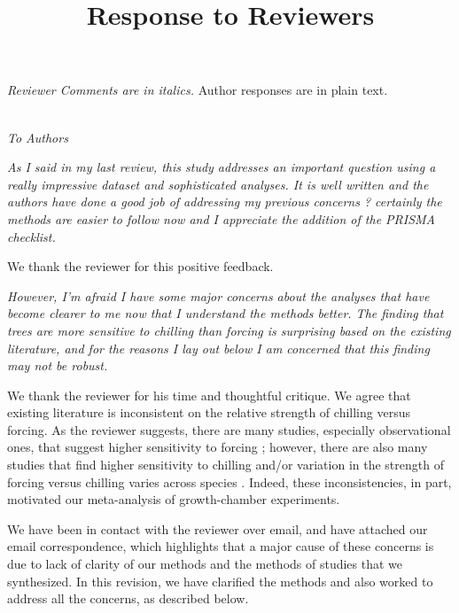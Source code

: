 \documentclass[11pt, a4paper]{article}
\begin{document}
{}


\setlength\parindent{0pt}


\title{Response to Reviewers}
\emph{Reviewer Comments are in italics.} Author responses are in plain text.\\

 \emph{}\\

\par \emph{To Authors}
\par \emph{As I said in my last review, this study addresses an important question using a really impressive
dataset and sophisticated analyses. It is well written and the authors have done a good job of
addressing my previous concerns ? certainly the methods are easier to follow now and I appreciate
the addition of the PRISMA checklist.}\\
\par We thank the reviewer for this positive feedback.
\par \emph{However, I'm afraid I have some major concerns about the analyses that have become clearer to me
now that I understand the methods better. The finding that trees are more sensitive to chilling than
forcing is surprising based on the existing literature, and for the reasons I lay out below I am
concerned that this finding may not be robust.}
\par We thank the reviewer for his time and thoughtful critique. We agree that existing literature is inconsistent on the relative strength of chilling versus forcing. As the reviewer suggests, there are many studies, especially observational ones, that suggest higher sensitivity to forcing \citep[e.g., ][]{fu2012,Rutishauser:2008} ; however, there are also many studies that find higher sensitivity to chilling \citep[e.g., ][]{zohner2016, Laube:2014a,Heide:2005aa} and/or variation in the strength of forcing versus chilling varies across species \citep[e.g.,][]{harrington2015,Basler:2014aa,Caffarra:2011a,Caffarra:2011b,koerner2010a}. Indeed, these inconsistencies, in part, motivated our meta-analysis of growth-chamber experiments. 

\par We have been in contact with the reviewer over email, and have attached our email correspondence, which highlights that a major cause of these concerns is due to lack of clarity of our methods and the methods of studies that we synthesized. In this revision, we have clarified the methods and also worked to address all the concerns, as described below.
\end{document}

